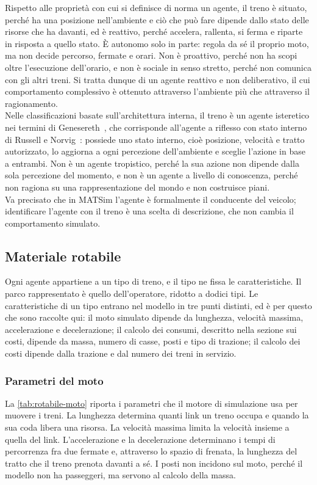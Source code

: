 Rispetto alle proprietà con cui si definisce di norma un agente, il treno è situato, perché ha una posizione nell'ambiente e ciò che può fare dipende dallo stato delle risorse che ha davanti, ed è reattivo, perché accelera, rallenta, si ferma e riparte in risposta a quello stato. È autonomo solo in parte: regola da sé il proprio moto, ma non decide percorso, fermate e orari. Non è proattivo, perché non ha scopi oltre l'esecuzione dell'orario, e non è sociale in senso stretto, perché non comunica con gli altri treni. Si tratta dunque di un agente reattivo e non deliberativo, il cui comportamento complessivo è ottenuto attraverso l'ambiente più che attraverso il ragionamento. \\
Nelle classificazioni basate sull'architettura interna, il treno è un agente isteretico nei termini di Genesereth~\cite{genesereth1987logical}, che corrisponde all'agente a riflesso con stato interno di Russell e Norvig~\cite{russell_norvig}: possiede uno stato interno, cioè posizione, velocità e tratto autorizzato, lo aggiorna a ogni percezione dell'ambiente e sceglie l'azione in base a entrambi. Non è un agente tropistico, perché la sua azione non dipende dalla sola percezione del momento, e non è un agente a livello di conoscenza, perché non ragiona su una rappresentazione del mondo e non costruisce piani. \\
Va precisato che in MATSim l'agente è formalmente il conducente del veicolo; identificare l'agente con il treno è una scelta di descrizione, che non cambia il comportamento simulato.

\subsection{Materiale rotabile}
\label{sec:materiale-rotabile}
Ogni agente appartiene a un tipo di treno, e il tipo ne fissa le caratteristiche. Il parco rappresentato è quello dell'operatore, ridotto a dodici tipi. Le caratteristiche di un tipo entrano nel modello in tre punti distinti, ed è per questo che sono raccolte qui: il moto simulato dipende da lunghezza, velocità massima, accelerazione e decelerazione; il calcolo dei consumi, descritto nella sezione sui costi, dipende da massa, numero di casse, posti e tipo di trazione; il calcolo dei costi dipende dalla trazione e dal numero dei treni in servizio.

\subsubsection{Parametri del moto}
La \cref{tab:rotabile-moto} riporta i parametri che il motore di simulazione usa per muovere i treni. La lunghezza determina quanti link un treno occupa e quando la sua coda libera una risorsa. La velocità massima limita la velocità insieme a quella del link. L'accelerazione e la decelerazione determinano i tempi di percorrenza fra due fermate e, attraverso lo spazio di frenata, la lunghezza del tratto che il treno prenota davanti a sé. I posti non incidono sul moto, perché il modello non ha passeggeri, ma servono al calcolo della massa.

